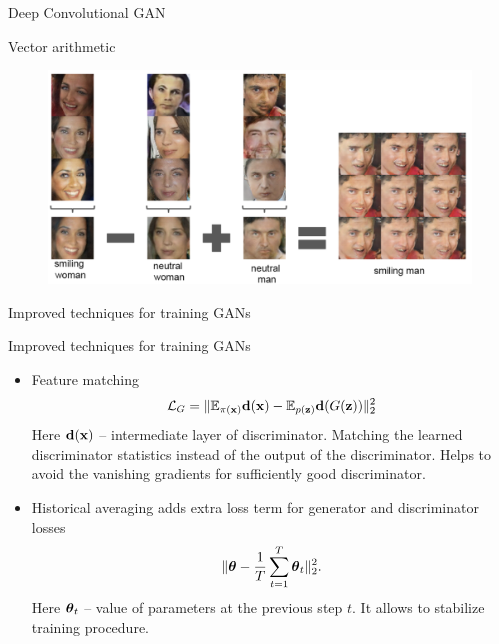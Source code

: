 \begin{frame}{Deep Convolutional GAN}
	\begin{block}{Vector arithmetic}
		\begin{figure}
			\centering
			\includegraphics[width=1.0\linewidth]{figs/dcgan_results_3}
		\end{figure}
	\end{block}

\end{frame}
\begin{frame}{Improved techniques for training GANs}
\end{frame}
\begin{frame}{Improved techniques for training GANs}
	\begin{itemize}
		\item Feature matching
		\[
			\mathcal{L}_G = \| \mathbb{E}_{\pi(\mathbf{x})} \mathbf{d}(\mathbf{x}) - \mathbb{E}_{p(\mathbf{z})} \mathbf{d}(G(\mathbf{z})) \|_2^2
		\]
		Here $\mathbf{d}(\mathbf{x})$ -- intermediate layer of discriminator. Matching the learned discriminator statistics instead of the output of the discriminator. Helps to avoid the vanishing gradients for sufficiently good discriminator.
		\item Historical averaging adds extra loss term for generator and discriminator losses
		\vspace{-0.2cm}
		\[
		 \| \boldsymbol{\theta} - \frac{1}{T}\sum_{t=1}^T \boldsymbol{\theta}_t\|^2_2.
		\]
		Here $\boldsymbol{\theta}_t$ -- value of parameters at the previous step $t$. It allows to stabilize training procedure.
	\end{itemize}
\end{frame}
